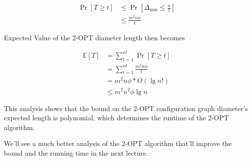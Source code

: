 \documentclass[12pt, a4paper]{article}
\begin{document}
\begin{align*}
    \Pr[T \geq t] &\leq \Pr\left[\Delta_{\text{min}} \leq \frac{n}{t}\right]\\
    &\leq \frac{m^2n \phi}{t}
\end{align*}

\noindent Expected Value of the 2-{\sf OPT} diameter length then becomes

\begin{align*}
    \mathbb{E}[T] &= \displaystyle\sum_{t = 1}^{n!} \Pr[T \geq t]\\
    &= \displaystyle\sum_{t = 1}^{n!} \frac{m^2n \phi}{t}\\
    &= m^2 n \phi * O(\lg{n!})\\
    &\leq m^2 n^2 \phi \lg{n}
\end{align*}

\noindent This analysis shows that the bound on the 2-{\sf OPT} configuration graph
diameter's expected length is polynomial, which determines the runtime of the 
2-{\sf OPT} algorithm.

\noindent We'll see a much better analysis of the 2-{\sf OPT} algorithm that'll improve the bound and the running time in the next lecture.
\end{document}
